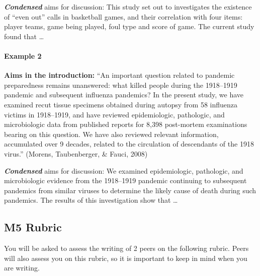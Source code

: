 \documentclass[
  openany]{book}
\begin{document}
\textbf{\emph{Condensed}} aims for discussion: This study set out to investigates the existence of ``even out'' calls in basketball games, and their correlation with four items: player teams, game being played, foul type and score of game. The current study found that \ldots{}

\hypertarget{example-2}{%
\paragraph{Example 2}\label{example-2}}

\textbf{Aims in the introduction:} ``An important question related to pandemic preparedness remains unanswered: what killed people during the 1918--1919 pandemic and subsequent influenza pandemics? In the present study, we have examined recut tissue specimens obtained during autopsy from 58 influenza victims in 1918--1919, and have reviewed epidemiologic, pathologic, and microbiologic data from published reports for 8,398 post-mortem examinations bearing on this question. We have also reviewed relevant information, accumulated over 9 decades, related to the circulation of descendants of the 1918 virus.'' (Morens, Taubenberger, \& Fauci, 2008)

\textbf{\emph{Condensed}} aims for discussion: We examined epidemiologic, pathologic, and microbiologic evidence from the 1918--1919 pandemic continuing to subsequent pandemics from similar viruses to determine the likely cause of death during such pandemics. The results of this investigation show that \ldots{}

\hypertarget{m5-rubric}{%
\subsection{M5 Rubric}\label{m5-rubric}}

You will be asked to assess the writing of 2 peers on the following rubric. Peers will also assess you on this rubric, so it is important to keep in mind when you are writing.
\end{document}
